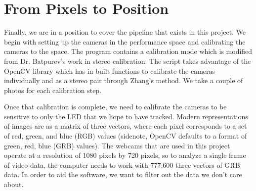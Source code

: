 \documentclass[
    12pt,
    twoside,
    bibstyle=chicago,
    headerstyle=uppercase,
	bibfile=biblatex_updating.bib
]{reedthesis}
\begin{document}

\section{From Pixels to Position}
Finally, we are in a position to cover the pipeline that exists in this project. We begin with setting up the cameras in the performance space and calibrating the cameras to the space. The program contains a calibration mode which is modified from Dr. Batpurev's work in stereo calibration\autocite{batpurevStereoCameraCalibration2021}. The script takes advantage of the OpenCV library which has in-built functions to calibrate the cameras individually and as a stereo pair through Zhang's method. We take a couple of photos for each calibration step.

Once that calibration is complete, we need to calibrate the cameras to be sensitive to only the LED that we hope to have tracked. Modern representations of images are as a matrix of three vectors, where each pixel corresponds to a set of red, green, and blue (RGB) values (sidenote, OpenCV defaults to a format of green, red, blue (GRB) values). The webcams that are used in this project operate at a resolution of 1080 pixels by 720 pixels, so to analyze a single frame of video data, the computer needs to work with 777,600 three vectors of GRB data. In order to aid the software, we want to filter out the data we don't care about.
\end{document}
